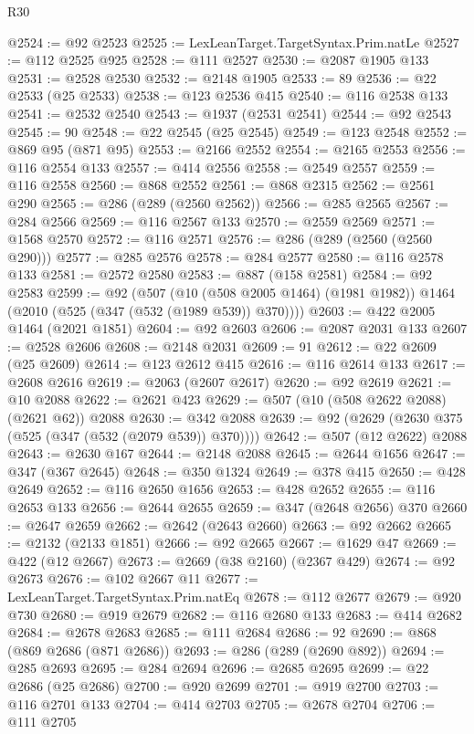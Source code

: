 \begin{lexlean}{R30}
\begin{coremodule}
@2524 := @92 @2523
@2525 := LexLeanTarget.TargetSyntax.Prim.natLe
@2527 := @112 @2525 @925
@2528 := @111 @2527
@2530 := @2087 @1905 @133
@2531 := @2528 @2530
@2532 := @2148 @1905
@2533 := 89
@2536 := @22 @2533 (@25 @2533)
@2538 := @123 @2536 @415
@2540 := @116 @2538 @133
@2541 := @2532 @2540
@2543 := @1937 (@2531 @2541)
@2544 := @92 @2543
@2545 := 90
@2548 := @22 @2545 (@25 @2545)
@2549 := @123 @2548
@2552 := @869 @95 (@871 @95)
@2553 := @2166 @2552
@2554 := @2165 @2553
@2556 := @116 @2554 @133
@2557 := @414 @2556
@2558 := @2549 @2557
@2559 := @116 @2558
@2560 := @868 @2552
@2561 := @868 @2315
@2562 := @2561 @290
@2565 := @286 (@289 (@2560 @2562))
@2566 := @285 @2565
@2567 := @284 @2566
@2569 := @116 @2567 @133
@2570 := @2559 @2569
@2571 := @1568 @2570
@2572 := @116 @2571
@2576 := @286 (@289 (@2560 (@2560 @290)))
@2577 := @285 @2576
@2578 := @284 @2577
@2580 := @116 @2578 @133
@2581 := @2572 @2580
@2583 := @887 (@158 @2581)
@2584 := @92 @2583
@2599 := @92
    (@507
      (@10 (@508 @2005 @1464) (@1981 @1982))
      @1464
      (@2010 (@525 (@347 (@532 (@1989 @539)) @370))))
@2603 := @422 @2005 @1464 (@2021 @1851)
@2604 := @92 @2603
@2606 := @2087 @2031 @133
@2607 := @2528 @2606
@2608 := @2148 @2031
@2609 := 91
@2612 := @22 @2609 (@25 @2609)
@2614 := @123 @2612 @415
@2616 := @116 @2614 @133
@2617 := @2608 @2616
@2619 := @2063 (@2607 @2617)
@2620 := @92 @2619
@2621 := @10 @2088
@2622 := @2621 @423
@2629 := @507 (@10 (@508 @2622 @2088) (@2621 @62)) @2088
@2630 := @342 @2088
@2639 := @92 (@2629 (@2630 @375 (@525 (@347 (@532 (@2079 @539)) @370))))
@2642 := @507 (@12 @2622) @2088
@2643 := @2630 @167
@2644 := @2148 @2088
@2645 := @2644 @1656
@2647 := @347 (@367 @2645)
@2648 := @350 @1324
@2649 := @378 @415
@2650 := @428 @2649
@2652 := @116 @2650 @1656
@2653 := @428 @2652
@2655 := @116 @2653 @133
@2656 := @2644 @2655
@2659 := @347 (@2648 @2656) @370
@2660 := @2647 @2659
@2662 := @2642 (@2643 @2660)
@2663 := @92 @2662
@2665 := @2132 (@2133 @1851)
@2666 := @92 @2665
@2667 := @1629 @47
@2669 := @422 (@12 @2667)
@2673 := @2669 (@38 @2160) (@2367 @429)
@2674 := @92 @2673
@2676 := @102 @2667 @11
@2677 := LexLeanTarget.TargetSyntax.Prim.natEq
@2678 := @112 @2677
@2679 := @920 @730
@2680 := @919 @2679
@2682 := @116 @2680 @133
@2683 := @414 @2682
@2684 := @2678 @2683
@2685 := @111 @2684
@2686 := 92
@2690 := @868 (@869 @2686 (@871 @2686))
@2693 := @286 (@289 (@2690 @892))
@2694 := @285 @2693
@2695 := @284 @2694
@2696 := @2685 @2695
@2699 := @22 @2686 (@25 @2686)
@2700 := @920 @2699
@2701 := @919 @2700
@2703 := @116 @2701 @133
@2704 := @414 @2703
@2705 := @2678 @2704
@2706 := @111 @2705

\end{coremodule}
\end{lexlean}
